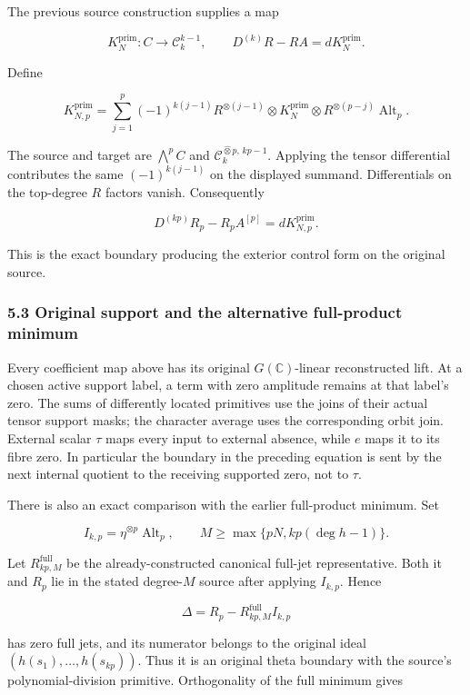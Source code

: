 The previous source construction supplies a map

\[
K_N^{\mathrm{prim}}:C\to\mathcal C_k^{k-1},
\qquad D^{(k)}R-RA=dK_N^{\mathrm{prim}}.
\]

Define

\[
\boxed{
K_{N,p}^{\mathrm{prim}}
=\sum_{j=1}^p(-1)^{k(j-1)}
R^{\otimes(j-1)}\otimes K_N^{\mathrm{prim}}\otimes R^{\otimes(p-j)}
\operatorname{Alt}_p.
}
\]

The source and target are \(\bigwedge^pC\) and
\(\mathcal C_k^{\widehat\otimes p,\,kp-1}\). Applying the tensor
differential contributes the same \((-1)^{k(j-1)}\) on the displayed
summand. Differentials on the top-degree \(R\) factors vanish.
Consequently

\[
\boxed{
D^{(kp)}R_p-R_pA^{[p]}=dK_{N,p}^{\mathrm{prim}}.
}
\]

This is the exact boundary producing the exterior control form on the
original source.

\subsubsection{5.3 Original support and the alternative full-product
minimum}\label{exterior_trace:original-support-and-the-alternative-full-product-minimum}

Every coefficient map above has its original \(G(\mathbb C)\)-linear
reconstructed lift. At a chosen active support label, a term with zero
amplitude remains at that label's zero. The sums of differently located
primitives use the joins of their actual tensor support masks; the
character average uses the corresponding orbit join. External scalar
\(\tau\) maps every input to external absence, while \(e\) maps it to
its fibre zero. In particular the boundary in the preceding equation is
sent by the next internal quotient to the receiving supported zero, not
to \(\tau\).

There is also an exact comparison with the earlier full-product minimum.
Set

\[
I_{k,p}=\eta^{\otimes p}\operatorname{Alt}_p,
\qquad M\geq\max\{pN,kp(\deg h-1)\}.
\]

Let \(R_{kp,M}^{\mathrm{full}}\) be the already-constructed canonical
full-jet representative. Both it and \(R_p\) lie in the stated
degree-\(M\) source after applying \(I_{k,p}\). Hence

\[
\Delta=R_p-R_{kp,M}^{\mathrm{full}}I_{k,p}
\]

has zero full jets, and its numerator belongs to the original ideal
\((h(s_1),\ldots,h(s_{kp}))\). Thus it is an original theta boundary
with the source's polynomial-division primitive. Orthogonality of the
full minimum gives

